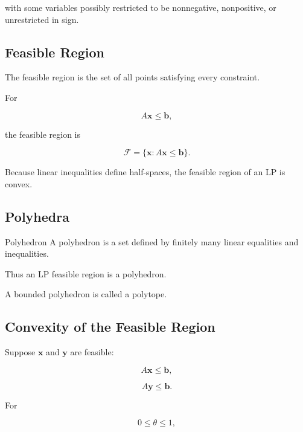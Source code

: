 with some variables possibly restricted to be nonnegative, nonpositive,
or unrestricted in sign.

\subsection{Feasible Region}
\label{subsec:lp-feasible-region}

The feasible region is the set of all points satisfying every constraint.

For

\[
A\mathbf{x}\leq\mathbf{b},
\]

the feasible region is

\[
\boxed{
\mathcal{F}
=
\{
\mathbf{x}:
A\mathbf{x}\leq\mathbf{b}
\}.
}
\]

Because linear inequalities define half-spaces, the feasible region of an
LP is convex.

\subsection{Polyhedra}
\label{subsec:lp-polyhedra}

\begin{definitionbox}{Polyhedron}
A polyhedron is a set defined by finitely many linear equalities and
inequalities.
\end{definitionbox}

Thus an LP feasible region is a polyhedron.

A bounded polyhedron is called a polytope.

\subsection{Convexity of the Feasible Region}
\label{subsec:lp-feasible-convex}

Suppose \(\mathbf{x}\) and \(\mathbf{y}\) are feasible:

\[
A\mathbf{x}\leq\mathbf{b},
\]

\[
A\mathbf{y}\leq\mathbf{b}.
\]

For

\[
0\leq\theta\leq1,
\]

